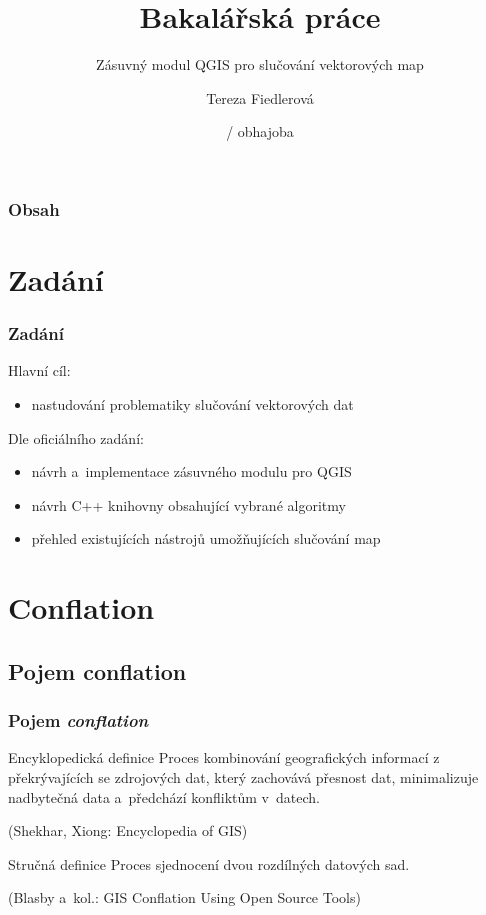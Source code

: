\documentclass[unicode,bookmarksnumbered]{beamer}
\title[Zásuvný modul QGIS pro slučování vektorových map]{Bakalářská práce}
\subtitle{Zásuvný modul QGIS pro slučování vektorových map}
\author{Tereza Fiedlerová}
\institute[ČVUT]{ČESKÉ VYSOKÉ UČENÍ TECHNICKÉ V PRAZE\\
		Katedra mapování a~kartografie}
\date[červen 2013]{{\denD} / obhajoba }
\begin{document}
  \begin{frame}
    \titlepage %
  \end{frame}

  \begin{frame}  %
    \frametitle{Obsah}
    \setcounter{tocdepth}{1}
    \tableofcontents 
  \end{frame}

  \section{Zadání}  %
  \begin{frame}
   \frametitle{Zadání}
    Hlavní cíl:
     \begin{itemize}
      \item nastudování problematiky slučování vektorových dat
     \end{itemize}
     Dle oficiálního zadání:
     \begin{itemize}
      \item návrh a~implementace zásuvného modulu pro QGIS
      \item návrh C++ knihovny obsahující vybrané algoritmy
      \item přehled existujících nástrojů umožňujících slučování map
     \end{itemize}
  \end{frame}

\section{Conflation}  %

  \subsection{Pojem conflation}
  \begin{frame}
  \frametitle{Pojem \textit{conflation}}

    \begin{block}{Encyklopedická definice}
     Proces kombinování geografických informací z překrývajících se
     zdrojových dat, který zachovává přesnost dat, minimalizuje 
     nadbytečná data a~předchází konfliktům v~datech.
    \end{block}
     {\small(Shekhar, Xiong: Encyclopedia of GIS)}

    \begin{block}{Stručná definice}
     Proces sjednocení dvou rozdílných datových sad.
    \end{block}
     {\small(Blasby a~kol.: GIS Conflation Using Open Source Tools)}

  \end{frame}
\end{document}
